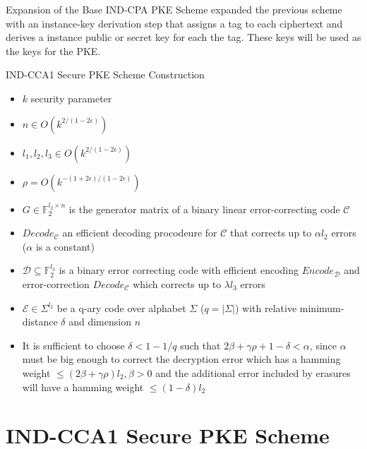 \documentclass{beamer}
\begin{document}
\begin{frame}{Expansion of the Base IND-CPA PKE Scheme}
  \cite{CCA} expanded the previous scheme with an instance-key derivation step  that assigns a tag to each ciphertext
  and derives a instance public or secret key for each the tag. These keys will be used as the keys for the PKE.

\end{frame}



\begin{frame}{IND-CCA1 Secure PKE Scheme Construction}
  \begin{itemize}
    \item $k$ security parameter
    \item $n \in O(k^{2/(1-2 \epsilon )})$
    \item $ l_1, l_2, l_3 \in O(k^{2/(1-2 \epsilon)})$
    \item $ \rho = O(k^{-(1+2 \epsilon)/(1-2 \epsilon)}) $
    \item $G \in \mathbb{F}_2^{l_2 \times n}$ is the generator matrix of a binary linear error-correcting code $\mathcal{C}$
    \item $Decode_{\mathcal{C}}$ an efficient decoding procodeure for $\mathcal{C}$ that corrects up to $ \alpha l_2 $ errors ($\alpha$ is a constant)
    \item $ \mathcal{D} \subseteq \mathbb{F}^{l_3}_2 $ is a binary error correcting code with efficient encoding $Encode_{\mathcal{D}}$ and error-correction $Decode_{\mathcal{C}}$ which corrects up to $\lambda l_3$ errors
    \item $\mathcal{E} \in \Sigma^{l_2} $ be a q-ary code over alphabet $\Sigma$ ($q = |\Sigma|$) with relative minimum-distance $\delta$ and dimension $n$
    \item It is sufficient to choose $\delta < 1-1/q$ such that $2\beta + \gamma \rho + 1 - \delta < \alpha$, since $\alpha$ must be big enough to correct the decryption error which has a hamming weight $\leq (2\beta + \gamma \rho)l_2, \beta > 0$ and the additional error included by erasures will have a hamming weight $ \leq (1-\delta)l_2$
  \end{itemize}

\end{frame}

\section{IND-CCA1 Secure PKE Scheme}
\end{document}
